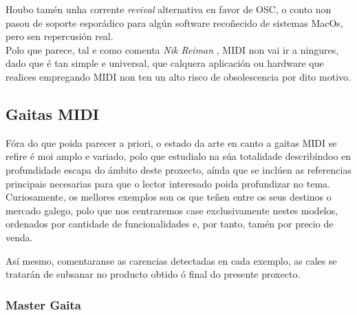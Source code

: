   Houbo tamén unha corrente \textit{revival} alternativa en favor de OSC, o
  conto non pasou de soporte esporádico para algún software recoñecido de
  sistemas MacOs, pero sen repercusión real. \\
  
  Polo que parece, tal e como comenta \textit{Nik Reiman} \cite{NikReiman}, MIDI
  non vai ir a ningures, dado que é tan simple e universal, que calquera
  aplicación ou hardware que realices empregando MIDI non ten un alto risco de
  obsolescencia por dito motivo.

 \subsection{Gaitas MIDI}

 Fóra do que poida parecer a priori, o estado da arte en canto a gaitas MIDI se
 refire é moi amplo e variado, polo que estudialo na súa totalidade
 describíndoo en profundidade escapa do ámbito deste proxecto, aínda que se
 inclúen as referencias principais necesarias para que o lector interesado
 poida profundizar no tema. \\

 Curiosamente, os mellores exemplos son os que teñen entre os seus destinos o
 mercado galego, polo que nos centraremos case exclusivamente nestes modelos,
 ordenados por cantidade de funcionalidades e, por tanto, tamén por precio de
 venda.

 Así mesmo, comentaranse as carencias detectadas en cada exemplo, as cales se
 tratarán de subsanar no producto obtido ó final do presente proxecto.

  \subsubsection{Master Gaita}


